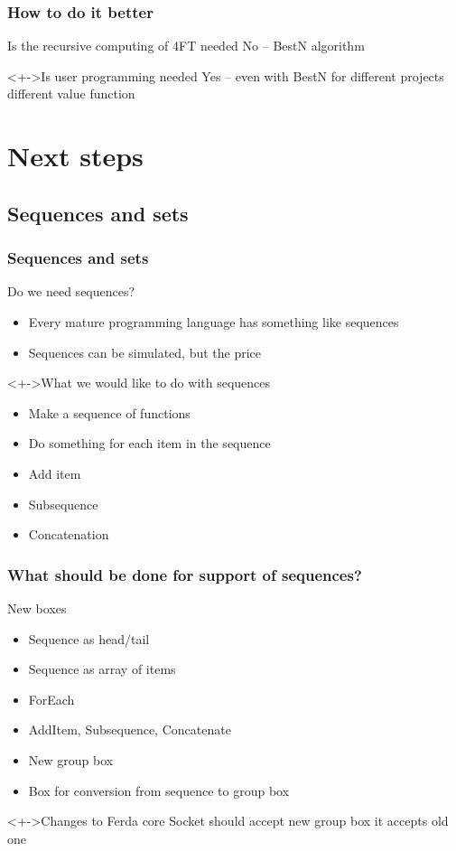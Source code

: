 \documentclass{beamer}
\begin{document}
\begin{frame}
	\frametitle{How to do it better}
	\begin{block}{Is the recursive computing of 4FT needed}
		\pause No -- BestN algorithm
	\end{block}
	\begin{block}<+->{Is user programming needed}
		\pause Yes -- even with BestN for different projects different value function
	\end{block}
\end{frame}

\section{Next steps}
\subsection{Sequences and sets}
\begin{frame}
	\frametitle{Sequences and sets}
	\begin{block}{Do we need sequences?}
		\begin{itemize}[<+->]
			\item Every mature programming language has something like sequences
			\item Sequences can be simulated, but the price
		\end{itemize}	
	\end{block}
	\begin{block}<+->{What we would like to do with sequences}
		\begin{itemize}[<+->]
			\item Make a sequence of functions
			\item Do something for each item in the sequence
			\item Add item
			\item Subsequence
			\item Concatenation 
		\end{itemize}	
	\end{block}
\end{frame}

\begin{frame}
	\frametitle{What should be done for support of sequences?}
	\begin{block}{New boxes}
		\begin{itemize}[<+->]
			\item Sequence as head/tail
			\item Sequence as array of items
			\item ForEach
			\item AddItem, Subsequence, Concatenate
			\item New group box
			\item Box for conversion from sequence to group box
		\end{itemize}	
	\end{block}
	\begin{block}<+->{Changes to Ferda core}
		\pause Socket should accept new group box it accepts old one
	\end{block}
\end{frame}
\end{document}
